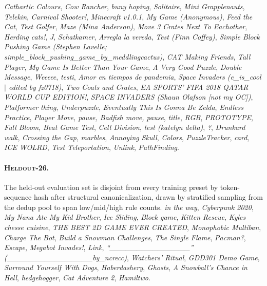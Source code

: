 {\textit{Cathartic Colours}, \textit{Cow Rancher}, \textit{buny
hoping}, \textit{Solitaire}, \textit{Mini Grapplenauts},
\textit{Telekin}, \textit{Carnival Shooter!}, \textit{Minecraft
v1.0.1}, \textit{My Game (Anonymous)}, \textit{Feed the Cat},
\textit{Test Golfer}, \textit{Maze (Mina Anderson)}, \textit{Move 3
Crates Next To Eachother}, \textit{Herding cats!}, \textit{J},
\textit{Schatkamer}, \textit{Arregla la vereda}, \textit{Test (Finn
Coffey)}, \textit{Simple Block Pushing Game (Stephen Lavelle;
simple\_block\_pushing\_game\_by\_meddlingcactus)}, \textit{CAT Making
Friends}, \textit{Tall Player}, \textit{My Game Is Better Than Your
Game}, \textit{A Very Good Puzzle}, \textit{Double Message},
\textit{Weeeee}, \textit{testi}, \textit{Amor en tiempos de
pandemia}, \textit{Space Invaders (e\_is\_cool $|$ edited by fz0718)},
\textit{Two Coats and Crates}, \textit{EA SPORTS' FIFA 2018 QATAR
WORLD CUP EDITION!}, \textit{SPACE INVADERS (Shaun Olafson [not my
OC])}, \textit{Platformer thing}, \textit{Underpuzzle},
\textit{Eventually This Is Gonna Be Zelda}, \textit{Endless
Practice}, \textit{Player Move, pause, Badfish move, pause},
\textit{title}, \textit{RGB}, \textit{PROTOTYPE}, \textit{Full Bloom},
\textit{Beat Game Test}, \textit{Cell Division}, \textit{test
(katelyn delta)}, \textit{?}, \textit{Drunkard walk}, \textit{Crossing
the Gap}, \textit{marbles}, \textit{Annoying Skull}, \textit{Colors},
\textit{PuzzleTracker}, \textit{card}, \textit{ICE WOLRD},
\textit{Test Teleportation}, \textit{Unlink}, \textit{PathFinding}.
}

\paragraph{\textsc{Heldout-26}.}
The held-out evaluation set is disjoint from every training preset by
token-sequence hash after structural canonicalization, drawn by
stratified sampling from the dedup pool to span low/mid/high rule
counts.
{\small
\textit{in the way}, \textit{Cyberpunk 2020}, \textit{My Nana Ate My
Kid Brother}, \textit{Ice Sliding}, \textit{Block game}, \textit{Kitten
Rescue}, \textit{Kyles chesse cuisine}, \textit{THE BEST 2D GAME EVER
CREATED}, \textit{Monophobic Multiban}, \textit{Charge The Bot},
\textit{Build a Snowman Challenges}, \textit{The Single Flame},
\textit{Pacman?}, \textit{Escape}, \textit{Megabot Invades!},
\textit{Link},
\textit{``\_\_\_\_\_\_\_\_\_\_\_\_\_\_\_'' (\_\_\_\_\_\_\_\_\_\_\_\_\_\_\_\_by\_ncrecc)},
\textit{Watchers' Ritual}, \textit{GDD301 Demo Game}, \textit{Surround
Yourself With Dogs}, \textit{Haberdashery}, \textit{Ghosts}, \textit{A
Snowball's Chance in Hell}, \textit{hedgehogger}, \textit{Cat
Adventure 2}, \textit{Hamiltwo}.
}

